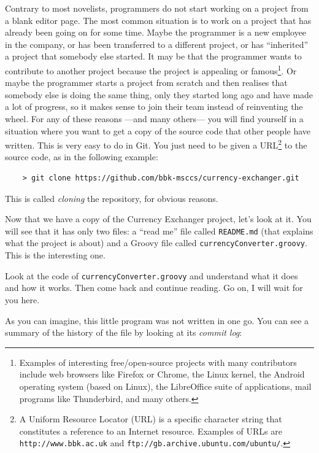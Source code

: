Contrary to most novelists, programmers do not start working on a
project from a blank editor page. The most common situation is to work
on a project that has already been going on for some time. Maybe the
programmer is a new employee in the company, or has been transferred
to a different project, or has ``inherited'' a project that somebody
else started. It may be that the programmer wants to contribute to
another project because the project is appealing or
famous\footnote{Examples of interesting free/open-source projects with
  many contributors include web browsers like Firefox or Chrome, the
  Linux kernel, the Android operating system (based on Linux), the
  LibreOffice suite of applications, mail programs 
  like Thunderbird, and many others.}. Or maybe the programmer starts a
project from scratch and then realises that somebody else is doing the
same thing, only they started long ago and have made a lot of
progress, so it makes sense to join their team instead of reinventing
the wheel. For any of these reasons ---and many others--- you will
find yourself in a situation where you want to get a copy of the
source code that other people have written. This is very easy to do in
Git. You just need to be given a URL\footnote{A Uniform
  Resource Locator (URL) is a specific character string that
  constitutes a reference to an Internet resource. Examples of URLs
  are \texttt{http://www.bbk.ac.uk} and
  \texttt{ftp://gb.archive.ubuntu.com/ubuntu/}.
} to the source code, as
in the following example:

\begin{verbatim}
    > git clone https://github.com/bbk-msccs/currency-exchanger.git
\end{verbatim}

This is called \emph{cloning} the repository, for obvious reasons. 

Now that we have a copy of the Currency Exchanger project, let's look
at it. You will see that it has only two files: a ``read me'' file
called \verb+README.md+ (that explains what the project is about) and
a Groovy file called \verb+currencyConverter.groovy+. This is the
interesting one. 

Look at the code of \verb+currencyConverter.groovy+ and understand
what it does and how it works. Then come back and continue reading. Go
on, I will wait for you here. 

As you can imagine, this little program was not written in one go. You
can see a summary of the history of the file by looking at its
\emph{commit log}: 

